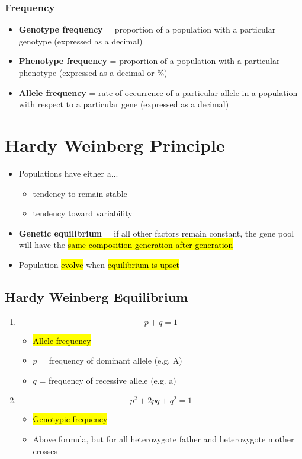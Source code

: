 \documentclass[a4paper,12pt]{article}
\begin{document}
\subsubsection{Frequency}
\begin{itemize}
    \item{\textbf{Genotype frequency} = proportion of a population with a particular genotype (expressed as a decimal)}
    \item{\textbf{Phenotype frequency} = proportion of a population with a particular phenotype (expressed as a decimal or \%)}
    \item{\textbf{Allele frequency} = rate of occurrence of a particular allele in a population with respect to a particular gene (expressed as a decimal)}
\end{itemize}

\section{Hardy Weinberg Principle}
\begin{itemize}
    \item{
            Populations have either a...
            \begin{itemize}
                \item{tendency to remain stable}
                \item{tendency toward variability}
            \end{itemize}
        }
    \item{\textbf{Genetic equilibrium} = if all other factors remain constant, the gene pool will have the \hl{same composition generation after generation}}
    \item{Population \hl{evolve} when \hl{equilibrium is upset}}
\end{itemize}

\subsection{Hardy Weinberg Equilibrium}\noindent

\begin{enumerate}
    \item{
            \Huge $$p + q = 1$$ \normalsize
            \begin{itemize}
                \item{\hl{Allele frequency}}
                \item{$p$ = frequency of dominant allele (e.g. A)}
                \item{$q$ = frequency of recessive allele (e.g. a)}
            \end{itemize}
        }
    \item{
            \Huge $$p^2 + 2pq + q^2 = 1$$ \normalsize
            \begin{itemize}
                \item{\hl{Genotypic frequency}}
                \item{Above formula, but for all heterozygote father and heterozygote mother crosses}
            \end{itemize}
        }
\end{enumerate}
\end{document}

